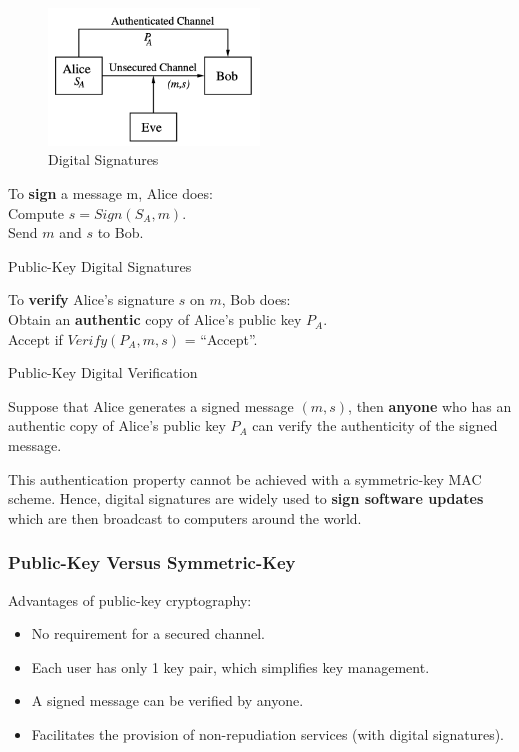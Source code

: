 \documentclass[12pt,titlepage]{article}
\begin{document}
\begin{center}
	\begin{figure}[h!]
		\centering
		\includegraphics[width=0.5\textwidth]{Digital_Signatures.png}
		\caption{Digital Signatures}
	\end{figure}
\end{center}
\newpage
\begin{algorithm}
	To \textbf{sign} a message m, Alice does:\\
	Compute $s = Sign(S_A, m)$. \\
	Send $m$ and $s$ to Bob.
	\caption{Public-Key Digital Signatures}
\end{algorithm}

\begin{algorithm}
	To \textbf{verify} Alice’s signature $s$ on $m$, Bob does:\\
	Obtain an \textbf{authentic} copy of Alice’s public key $P_A$.\\
	Accept if $Verify(P_A , m, s)$ = ``Accept''.
	\caption{Public-Key Digital Verification}
\end{algorithm}

Suppose that Alice generates a signed message $(m, s)$, then \textbf{anyone} who has an authentic copy of Alice’s public key $P_A$ can verify the authenticity of the signed message. 

This authentication property cannot be achieved with a symmetric-key MAC scheme. Hence, digital signatures are widely used to \textbf{sign software updates} which are then broadcast to computers around the world.

\subsubsection{Public-Key Versus Symmetric-Key}
Advantages of public-key cryptography: \begin{itemize}
	\item No requirement for a secured channel.
	\item Each user has only 1 key pair, which simplifies key management.
	\item A signed message can be verified by anyone.
	\item Facilitates the provision of non-repudiation services (with digital signatures).
\end{itemize}
\end{document}

